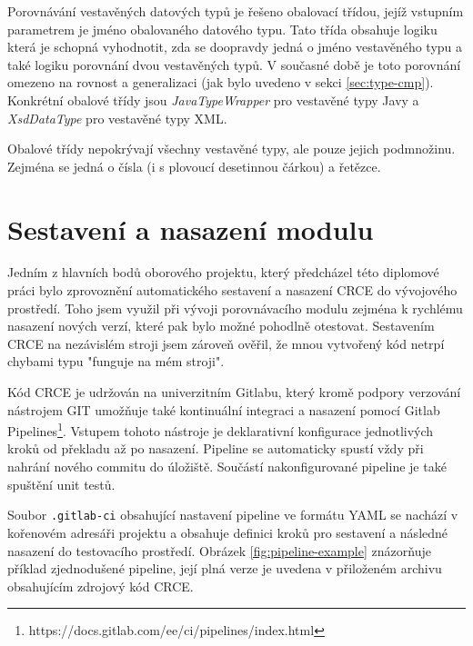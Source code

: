 \documentclass[czech,DP]{thesiskiv}
\begin{document}
Porovnávání vestavěných datových typů je řešeno obalovací třídou, jejíž vstupním parametrem je jméno obalovaného datového typu. Tato třída obsahuje logiku která je schopná vyhodnotit, zda se doopravdy jedná o jméno vestavěného typu a také logiku porovnání dvou vestavěných typů. V současné době je toto porovnání omezeno na rovnost a generalizaci (jak bylo uvedeno v sekci \ref{sec:type-cmp}). Konkrétní obalové třídy jsou \textit{JavaTypeWrapper} pro vestavěné typy Javy a \textit{XsdDataType} pro vestavěné typy XML. 

Obalové třídy nepokrývají všechny vestavěné typy, ale pouze jejich podmnožinu. Zejména se jedná o čísla (i s plovoucí desetinnou čárkou) a řetězce.

\section{Sestavení a nasazení modulu}

Jedním z hlavních bodů oborového projektu, který předcházel této diplomové práci bylo zprovoznění automatického sestavení a nasazení CRCE do vývojového prostředí. Toho jsem využil při vývoji porovnávacího modulu zejména k rychlému nasazení nových verzí, které pak bylo možné pohodlně otestovat. Sestavením CRCE na nezávislém stroji jsem zároveň ověřil, že mnou vytvořený kód netrpí chybami typu "funguje na mém stroji".

Kód CRCE je udržován na univerzitním Gitlabu, který kromě podpory verzování nástrojem GIT umožňuje také kontinuální integraci a nasazení pomocí Gitlab Pipelines\footnote{https://docs.gitlab.com/ee/ci/pipelines/index.html}. Vstupem tohoto nástroje je deklarativní konfigurace jednotlivých kroků od překladu až po nasazení. Pipeline se automaticky spustí vždy při nahrání nového commitu do úložiště. Součástí nakonfigurované pipeline je také spuštění unit testů.

Soubor \verb|.gitlab-ci| obsahující nastavení pipeline ve formátu YAML se nachází v kořenovém adresáři projektu a obsahuje definici kroků pro sestavení a následné nasazení do testovacího prostředí. Obrázek \ref{fig:pipeline-example} znázorňuje příklad zjednodušené pipeline, její plná verze je uvedena v přiloženém archivu obsahujícím zdrojový kód CRCE. 
\end{document}
